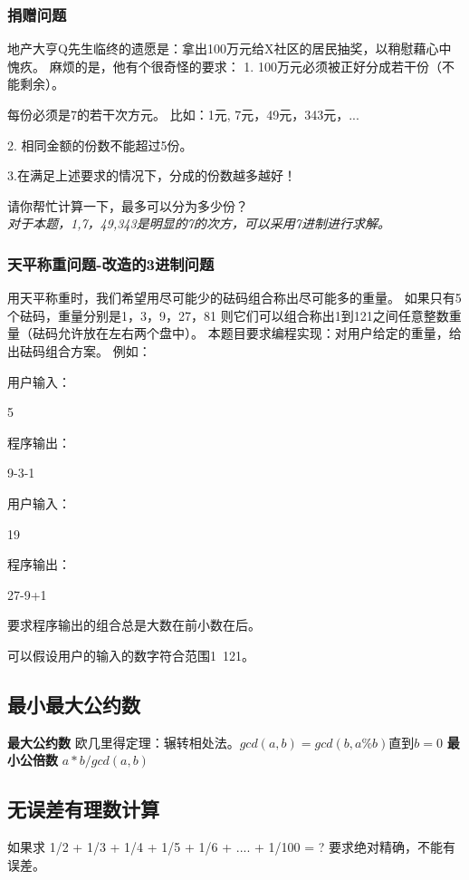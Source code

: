 \documentclass[a4paper]{article}
\begin{document}
	\subsubsection{捐赠问题}
	地产大亨Q先生临终的遗愿是：拿出100万元给X社区的居民抽奖，以稍慰藉心中愧疚。
	麻烦的是，他有个很奇怪的要求：
	1. 100万元必须被正好分成若干份（不能剩余）。
	
	每份必须是7的若干次方元。
	比如：1元, 7元，49元，343元，...
	
	2. 相同金额的份数不能超过5份。
	
	3.在满足上述要求的情况下，分成的份数越多越好！
	
	请你帮忙计算一下，最多可以分为多少份？\\
	\textit{对于本题，1,7，49,343是明显的7的次方，可以采用7进制进行求解。}
	
	
	\subsubsection{天平称重问题-改造的3进制问题}
	用天平称重时，我们希望用尽可能少的砝码组合称出尽可能多的重量。
	如果只有5个砝码，重量分别是1，3，9，27，81
	则它们可以组合称出1到121之间任意整数重量（砝码允许放在左右两个盘中）。
	本题目要求编程实现：对用户给定的重量，给出砝码组合方案。
	例如：
	
	用户输入：
	
	5
	
	程序输出：
	
	9-3-1
	
	用户输入：
	
	19
	
	程序输出：
	
	27-9+1
	
	要求程序输出的组合总是大数在前小数在后。
	
	可以假设用户的输入的数字符合范围1~121。
	
	
	\subsection{最小最大公约数}
	\textbf{最大公约数}
	欧几里得定理：辗转相处法。$gcd(a,b) = gcd(b,a\%b)直到b=0$
	\textbf{最小公倍数}
	$a*b/gcd(a,b)$
	
	\subsection{无误差有理数计算}
	
	如果求 1/2 + 1/3 + 1/4 + 1/5 + 1/6 + .... + 1/100 = ?
	要求绝对精确，不能有误差。
	
	
\end{document}
